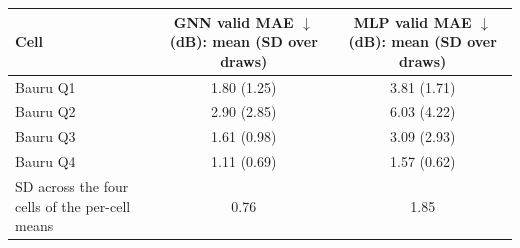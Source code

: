 \begin{tabular}{lcc}
\toprule
Cell & \celula{GNN valid \\ \relax MAE $\downarrow$ (dB): \\ \relax mean (SD \\ \relax over draws)} & \celula{MLP valid \\ \relax MAE $\downarrow$ (dB): \\ \relax mean (SD \\ \relax over draws)} \\
\midrule
Bauru Q1 & 1.80 (1.25) & 3.81 (1.71) \\
Bauru Q2 & 2.90 (2.85) & 6.03 (4.22) \\
Bauru Q3 & 1.61 (0.98) & 3.09 (2.93) \\
Bauru Q4 & 1.11 (0.69) & 1.57 (0.62) \\
\midrule
SD across the four cells of the per-cell means & 0.76 & 1.85 \\
\bottomrule
\end{tabular}
